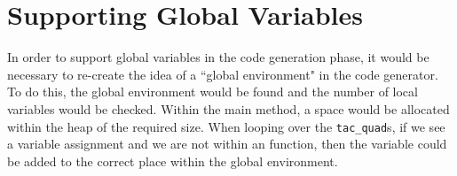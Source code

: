 \section{Supporting Global Variables}
In order to support global variables in the code generation phase, it would be necessary to re-create the idea of a ``global environment" in the code generator. To do this, the global environment would be found and the number of local variables would be checked. Within the main method, a space would be allocated within the heap of the required size. When looping over the \verb!tac_quad!s, if we see a variable assignment and we are not within an function, then the variable could be added to the correct place within the global environment.